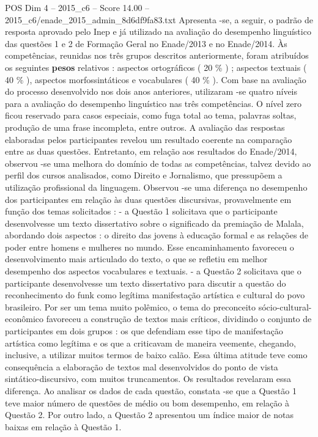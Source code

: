 \begin{textsample}{POS Dim 4 – 2015\_c6 – Score 14.00 – 2015\_c6/enade\_2015\_admin\_8d6df9fa83.txt}
Apresenta -se, a seguir, o padrão de resposta aprovado pelo Inep e já utilizado na avaliação do desempenho linguístico das questões 1 e 2 de Formação Geral no Enade/2013 e no Enade/2014.
Às competências, reunidas nos três grupos descritos anteriormente, foram atribuídos os seguintes \textbf{pesos} relativos : aspectos ortográficos ( 20 \% ) ; aspectos textuais ( 40 \% ), aspectos morfossintáticos e vocabulares ( 40 \% ).
Com base na avaliação do processo desenvolvido nos dois anos anteriores, utilizaram -se quatro níveis para a avaliação do desempenho linguístico nas três competências.
O nível zero ficou reservado para casos especiais, como fuga total ao tema, palavras soltas, produção de uma frase incompleta, entre outros.
A avaliação das respostas elaboradas pelos participantes revelou um resultado coerente na comparação entre as duas questões.
Entretanto, em relação aos resultados do Enade/2014, observou -se uma melhora do domínio de todas as competências, talvez devido ao perfil dos cursos analisados, como Direito e Jornalismo, que pressupõem a utilização profissional da linguagem.
Observou -se uma diferença no desempenho dos participantes em relação às duas questões discursivas, provavelmente em função dos temas solicitados : - a Questão 1 solicitava que o participante desenvolvesse um texto dissertativo sobre o significado da premiação de Malala, abordando dois aspectos : o direito das jovens à educação formal e as relações de poder entre homens e mulheres no mundo.
Esse encaminhamento favoreceu o desenvolvimento mais articulado do texto, o que se refletiu em melhor desempenho dos aspectos vocabulares e textuais. - a Questão 2 solicitava que o participante desenvolvesse um texto dissertativo para discutir a questão do reconhecimento do funk como legítima manifestação artística e cultural do povo brasileiro.
Por ser um tema muito polêmico, o tema do preconceito sócio-cultural-econômico favoreceu a construção de textos mais críticos, dividindo o conjunto de participantes em dois grupos : os que defendiam esse tipo de manifestação artística como legítima e os que a criticavam de maneira veemente, chegando, inclusive, a utilizar muitos termos de baixo calão.
Essa última atitude teve como consequência a elaboração de textos mal desenvolvidos do ponto de vista sintático-discursivo, com muitos truncamentos.
Os resultados revelaram essa diferença.
Ao analisar os dados de cada questão, constata -se que a Questão 1 teve maior número de questões de médio ou bom desempenho, em relação à Questão 2.
Por outro lado, a Questão 2 apresentou um índice maior de notas baixas em relação à Questão 1.

\end{textsample}
